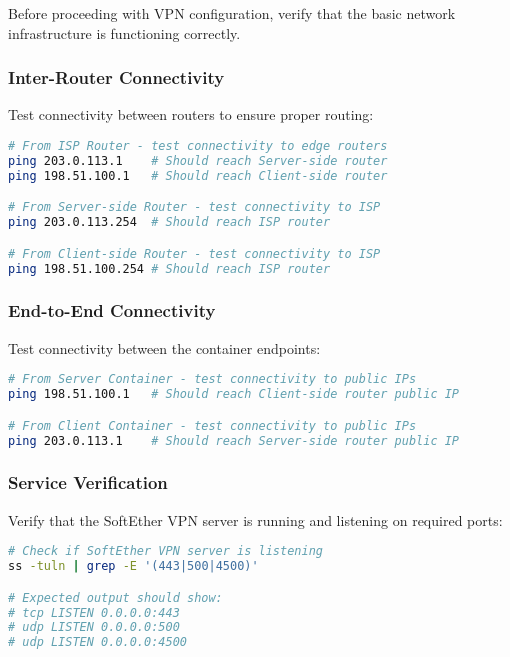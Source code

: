 Before proceeding with VPN configuration, verify that the basic network infrastructure is functioning correctly.

\subsubsection{Inter-Router Connectivity}

Test connectivity between routers to ensure proper routing:

\begin{lstlisting}[language=bash]
# From ISP Router - test connectivity to edge routers
ping 203.0.113.1    # Should reach Server-side router
ping 198.51.100.1   # Should reach Client-side router

# From Server-side Router - test connectivity to ISP
ping 203.0.113.254  # Should reach ISP router

# From Client-side Router - test connectivity to ISP  
ping 198.51.100.254 # Should reach ISP router
\end{lstlisting}

\subsubsection{End-to-End Connectivity}

Test connectivity between the container endpoints:

\begin{lstlisting}[language=bash]
# From Server Container - test connectivity to public IPs
ping 198.51.100.1   # Should reach Client-side router public IP

# From Client Container - test connectivity to public IPs
ping 203.0.113.1    # Should reach Server-side router public IP
\end{lstlisting}

\subsubsection{Service Verification}

Verify that the SoftEther VPN server is running and listening on required ports:

\begin{lstlisting}[language=bash]
# Check if SoftEther VPN server is listening
ss -tuln | grep -E '(443|500|4500)'

# Expected output should show:
# tcp LISTEN 0.0.0.0:443
# udp LISTEN 0.0.0.0:500  
# udp LISTEN 0.0.0.0:4500
\end{lstlisting}


